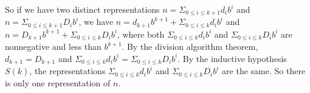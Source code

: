 \documentclass[12pt]{article}
\begin{document}
So if we have two distinct representations $n=\Sigma_{0 \leq i \leq k+1}d_ib^i$ and $n=\Sigma_{0 \leq i \leq k+1}D_ib^i$,
we have $n = d_{k+1}b^{k+1} + \Sigma_{0 \leq i \leq k}d_ib^i$ and $n = D_{k+1}b^{k+1} + \Sigma_{0 \leq i \leq k}D_ib^i$, where both $\Sigma_{0 \leq i \leq k}d_ib^i$ and $\Sigma_{0 \leq i \leq k}D_ib^i$ are nonnegative and less
than $b^{k+1}$.  By the division algorithm theorem, $d_{k+1} = D_{k+1}$ and $\Sigma_{0 \leq i \leq k}d_ib^i = \Sigma_{0 \leq i \leq k}D_ib^i$.  By the inductive hypothesis $S(k)$, the representations $\Sigma_{0 \leq i \leq k}d_ib^i$ and $\Sigma_{0 \leq i \leq k}D_ib^i$ are the same.  So there is only one representation of $n$.
\end{document}
